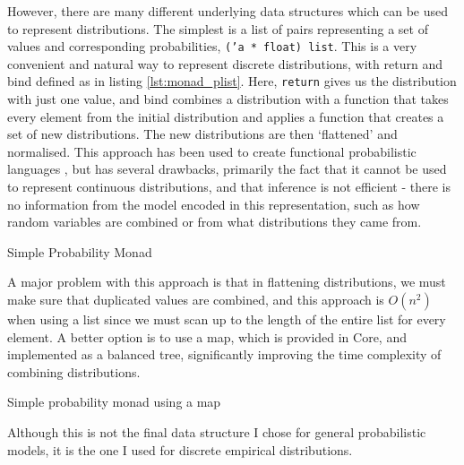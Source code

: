 However, there are many different underlying data structures which can be used to represent distributions. The simplest is a list of pairs representing a set of values and corresponding probabilities, \texttt{('a * float) list}. This is a very convenient and natural way to represent discrete distributions, with return and bind defined as in listing \ref{lst:monad_plist}. Here, \texttt{return} gives us the distribution with just one value, and bind combines a distribution with a function that takes every element from the initial distribution and applies a function that creates a set of new distributions. The new distributions are then `flattened' and normalised. This approach has been used to create functional probabilistic languages \cite{erwig}, but has several drawbacks, primarily the fact that it cannot be used to represent continuous distributions, and that inference is not efficient - there is no information from the model encoded in this representation, such as how random variables are combined or from what distributions they came from.

\begin{listing}[!ht]
	\caption{Simple Probability Monad}
	\label{lst:monad_plist}
\end{listing}
	
A major problem with this approach is that in flattening distributions, we must make sure that duplicated values are combined, and this approach is $O(n^2)$ when using a list since we must scan up to the length of the entire list for every element. A better option is to use a map, which is provided in Core, and implemented as a balanced tree, significantly improving the time complexity of combining distributions.
	
\begin{listing}[!ht]
	\caption{Simple probability monad using a map}
	\label{lst:monad_pmap}
\end{listing}
	
Although this is not the final data structure I chose for general probabilistic models, it is the one I used for discrete empirical distributions.
	
